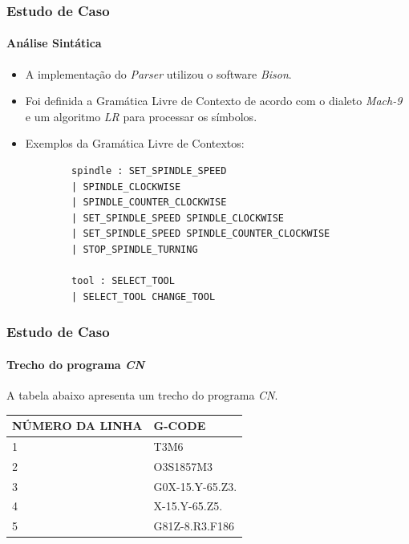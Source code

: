 \documentclass[aspectratio=169]{beamer}
\begin{document}
{\begin{frame}
\end{frame}


\begin{frame}[fragile]
  \frametitle{Estudo de Caso}
  \framesubtitle{Análise Sintática}
  \begin{itemize}
    \item A implementação do \emph{Parser} utilizou o software 
          \emph{Bison}.
    \item Foi definida a Gramática Livre de Contexto de acordo com o 
          dialeto \emph{Mach-9} e um algoritmo \emph{LR}
          para processar os símbolos.
    \item Exemplos da Gramática Livre de Contextos:
      \begin{lstlisting}
        spindle : SET_SPINDLE_SPEED
        | SPINDLE_CLOCKWISE
        | SPINDLE_COUNTER_CLOCKWISE
        | SET_SPINDLE_SPEED SPINDLE_CLOCKWISE
        | SET_SPINDLE_SPEED SPINDLE_COUNTER_CLOCKWISE
        | STOP_SPINDLE_TURNING
      
        tool : SELECT_TOOL
        | SELECT_TOOL CHANGE_TOOL    
    \end{lstlisting}
  \end{itemize}

\end{frame}  


\begin{frame}[fragile]
  \frametitle{Estudo de Caso}
  \framesubtitle{Trecho do programa \emph{CN}}

  A tabela abaixo apresenta um trecho do programa \emph{CN}.

  \vspace{3mm}

  \begin{tabular}{l|l}
    \hline
    \scriptsize{\bfseries{NÚMERO DA LINHA}} & 
    \scriptsize{\bfseries{G-CODE}} \\
    \hline

    \scriptsize{1} & \scriptsize{T3M6} \\    
    \hline

    \scriptsize{2} & \scriptsize{O3S1857M3} \\
    \hline

    \scriptsize{3} & \scriptsize{G0X-15.Y-65.Z3.} \\
    \hline
      
    \scriptsize{4} & \scriptsize{X-15.Y-65.Z5.} \\
    \hline

    \scriptsize{5} & \scriptsize{G81Z-8.R3.F186} \\
    \hline


\end{tabular}
\end{frame}}
\end{document}
